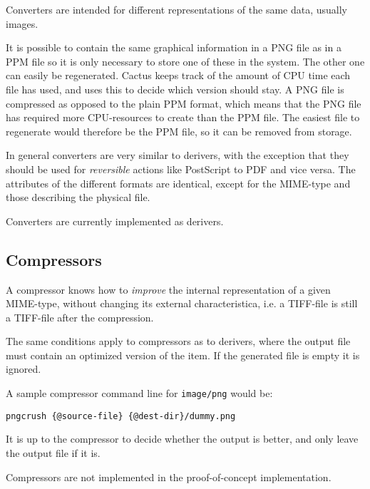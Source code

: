 Converters are intended for different representations of the same
data, usually images.

It is possible to contain the same graphical information in a PNG file
as in a PPM file so it is only necessary to store one of these in the
system.   The other one can easily be regenerated.  Cactus keeps track
of the amount of CPU time each file has used, and uses this to decide
which version should stay.   A PNG file is compressed as opposed to
the plain PPM format, which means that the PNG file has required more
CPU-resources to create than the PPM file.  The easiest file to
regenerate would therefore be the PPM file, so it can be removed from
storage.

In general converters are very similar to derivers, with the exception
that they should be used for \textit{reversible} actions like
PostScript to PDF and vice versa.   The attributes of the different
formats are identical, except for the MIME-type and those describing
the physical file.

Converters are currently implemented as derivers.

\subsection{Compressors}

A compressor knows how to \textit{improve} the internal representation
of a given MIME-type, without changing its external characteristica,
i.e. a TIFF-file is still a TIFF-file after the compression.

The same conditions apply to compressors as to derivers, where the
output file must contain an optimized version of the item.  If the
generated file is empty it is ignored.

A sample compressor command line for \texttt{image/png} would be:

\begin{verbatim}
pngcrush {@source-file} {@dest-dir}/dummy.png
\end{verbatim}

It is up to the compressor to decide whether the output is better, and
only leave the output file if it is.

Compressors are not implemented in the proof-of-concept
implementation.





